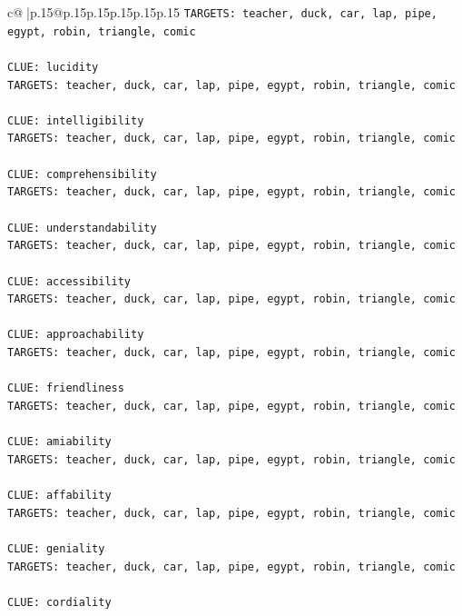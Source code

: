 \documentclass{article}
\begin{document}
{\begin{supertabular}{c@{$\;$}|p{.15\linewidth}@{}p{.15\linewidth}p{.15\linewidth}p{.15\linewidth}p{.15\linewidth}p{.15\linewidth}}
{{{\texttt{TARGETS: teacher, duck, car, lap, pipe, egypt, robin, triangle, comic} \\
\\ 
\texttt{CLUE: lucidity} \\
\texttt{TARGETS: teacher, duck, car, lap, pipe, egypt, robin, triangle, comic} \\
\\ 
\texttt{CLUE: intelligibility} \\
\texttt{TARGETS: teacher, duck, car, lap, pipe, egypt, robin, triangle, comic} \\
\\ 
\texttt{CLUE: comprehensibility} \\
\texttt{TARGETS: teacher, duck, car, lap, pipe, egypt, robin, triangle, comic} \\
\\ 
\texttt{CLUE: understandability} \\
\texttt{TARGETS: teacher, duck, car, lap, pipe, egypt, robin, triangle, comic} \\
\\ 
\texttt{CLUE: accessibility} \\
\texttt{TARGETS: teacher, duck, car, lap, pipe, egypt, robin, triangle, comic} \\
\\ 
\texttt{CLUE: approachability} \\
\texttt{TARGETS: teacher, duck, car, lap, pipe, egypt, robin, triangle, comic} \\
\\ 
\texttt{CLUE: friendliness} \\
\texttt{TARGETS: teacher, duck, car, lap, pipe, egypt, robin, triangle, comic} \\
\\ 
\texttt{CLUE: amiability} \\
\texttt{TARGETS: teacher, duck, car, lap, pipe, egypt, robin, triangle, comic} \\
\\ 
\texttt{CLUE: affability} \\
\texttt{TARGETS: teacher, duck, car, lap, pipe, egypt, robin, triangle, comic} \\
\\ 
\texttt{CLUE: geniality} \\
\texttt{TARGETS: teacher, duck, car, lap, pipe, egypt, robin, triangle, comic} \\
\\ 
\texttt{CLUE: cordiality} \\
}}}
\end{supertabular}}
\end{document}
